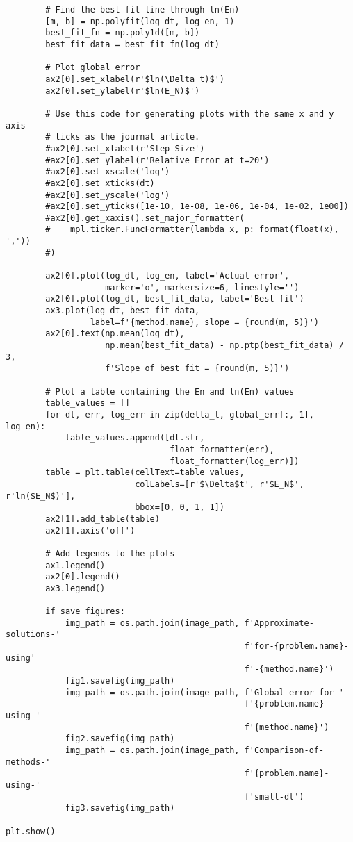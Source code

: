 \documentclass{article}
\begin{document}
\begin{verbatim}
        # Find the best fit line through ln(En)
        [m, b] = np.polyfit(log_dt, log_en, 1)
        best_fit_fn = np.poly1d([m, b])
        best_fit_data = best_fit_fn(log_dt)

        # Plot global error
        ax2[0].set_xlabel(r'$ln(\Delta t)$')
        ax2[0].set_ylabel(r'$ln(E_N)$')

        # Use this code for generating plots with the same x and y axis
        # ticks as the journal article.
        #ax2[0].set_xlabel(r'Step Size')
        #ax2[0].set_ylabel(r'Relative Error at t=20')
        #ax2[0].set_xscale('log')
        #ax2[0].set_xticks(dt)
        #ax2[0].set_yscale('log')
        #ax2[0].set_yticks([1e-10, 1e-08, 1e-06, 1e-04, 1e-02, 1e00])
        #ax2[0].get_xaxis().set_major_formatter(
        #    mpl.ticker.FuncFormatter(lambda x, p: format(float(x), ','))
        #)

        ax2[0].plot(log_dt, log_en, label='Actual error',
                    marker='o', markersize=6, linestyle='')
        ax2[0].plot(log_dt, best_fit_data, label='Best fit')
        ax3.plot(log_dt, best_fit_data,
                 label=f'{method.name}, slope = {round(m, 5)}')
        ax2[0].text(np.mean(log_dt),
                    np.mean(best_fit_data) - np.ptp(best_fit_data) / 3,
                    f'Slope of best fit = {round(m, 5)}')

        # Plot a table containing the En and ln(En) values
        table_values = []
        for dt, err, log_err in zip(delta_t, global_err[:, 1], log_en):
            table_values.append([dt.str,
                                 float_formatter(err),
                                 float_formatter(log_err)])
        table = plt.table(cellText=table_values,
                          colLabels=[r'$\Delta$t', r'$E_N$', r'ln($E_N$)'],
                          bbox=[0, 0, 1, 1])
        ax2[1].add_table(table)
        ax2[1].axis('off')

        # Add legends to the plots
        ax1.legend()
        ax2[0].legend()
        ax3.legend()

        if save_figures:
            img_path = os.path.join(image_path, f'Approximate-solutions-'
                                                f'for-{problem.name}-using'
                                                f'-{method.name}')
            fig1.savefig(img_path)
            img_path = os.path.join(image_path, f'Global-error-for-'
                                                f'{problem.name}-using-'
                                                f'{method.name}')
            fig2.savefig(img_path)
            img_path = os.path.join(image_path, f'Comparison-of-methods-'
                                                f'{problem.name}-using-'
                                                f'small-dt')
            fig3.savefig(img_path)

plt.show()

\end{verbatim}
\end{document}
